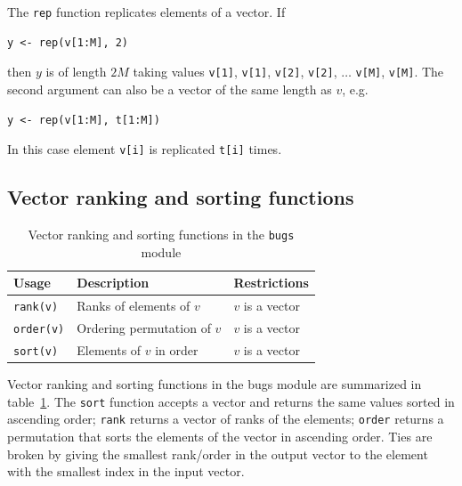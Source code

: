 \documentclass[11pt, a4paper, titlepage]{report}
\begin{document}
The \texttt{rep} function replicates elements of a vector. If
\begin{verbatim}
y <- rep(v[1:M], 2)
\end{verbatim}
then $y$ is of length $2M$ taking values \verb+v[1]+, \verb+v[1]+,
\verb+v[2]+, \verb+v[2]+, $\ldots$ \verb+v[M]+, \verb+v[M]+.
The second argument can also be a vector of the same length as $v$,
e.g.
\begin{verbatim}
y <- rep(v[1:M], t[1:M])
\end{verbatim}
In this case element \verb+v[i]+ is replicated \verb+t[i]+ times.

\subsection{Vector ranking and sorting functions}

\begin{table}
\begin{center}
\begin{tabular}{lll}
\hline
Usage & Description & Restrictions \\
\hline
\verb+rank(v)+ & Ranks of elements of $v$ & $v$ is a vector   \\
\verb+order(v)+ & Ordering permutation of $v$ & $v$ is a vector \\
\verb+sort(v)+ & Elements of $v$ in order & $v$ is a vector \\
\hline
\end{tabular}
\caption{Vector ranking and sorting functions in the \texttt{bugs}
  module \label{table:bugs:ranking}}
\end{center}
\end{table}

Vector ranking and sorting functions in the bugs module are summarized
in table~\ref{table:bugs:ranking}. The \texttt{sort} function accepts
a vector and returns the same values sorted in ascending order;
\texttt{rank} returns a vector of ranks of the elements;
\texttt{order} returns a permutation that sorts the elements of the
vector in ascending order.  Ties are broken by giving the smallest
rank/order in the output vector to the element with the smallest index
in the input vector.
\end{document}
